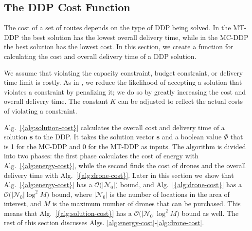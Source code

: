 \documentclass[journal]{IEEEtran}
\begin{document}
\subsection{The DDP Cost Function}
\label{ssec:route-costs}

The cost of a set of routes depends on the type of DDP being solved. In the MT-DDP the best solution has the lowest overall delivery time, while in the MC-DDP the best solution has the lowest cost. In this section, we create a function for calculating the cost and overall delivery time of a DDP solution.

We assume that violating the capacity constraint, budget constraint, or delivery time limit is costly. As in \cite{Xiao2012}, we reduce the likelihood of accepting a solution that violates a constraint by penalizing it; we do so by greatly increasing the cost and overall delivery time. The constant ${\ensuremath{K}}$ can be adjusted to reflect the actual costs of violating a constraint.

{Alg.~\ref{{alg:solution-cost}}} calculates the overall cost and delivery time of a solution ${\ensuremath{\mathbf{s}}}$ to the DDP. It takes the solution vector ${\ensuremath{\mathbf{s}}}$ and a boolean value ${\ensuremath{\Phi}}$ that is 1 for the MC-DDP and 0 for the MT-DDP as inputs. The algorithm is divided into two phases: the first phase calculates the cost of energy with {Alg.~\ref{{alg:energy-cost}}}, while the second finds the cost of drones and the overall delivery time with {Alg.~\ref{{alg:drone-cost}}}. Later in this section we show that {Alg.~\ref{{alg:energy-cost}}} has a ${\ensuremath{\mathcal{O}\bigl({|{\ensuremath{{\ensuremath{\mathcal{N}}}_{0}}}|}\bigr)}}$ bound, and {Alg.~\ref{{alg:drone-cost}}} has a ${\ensuremath{\mathcal{O}\bigl({|{\ensuremath{{\ensuremath{\mathcal{N}}}_{0}}}|\log^2{\ensuremath{M}}}\bigr)}}$ bound, where $|{\ensuremath{{\ensuremath{\mathcal{N}}}_{0}}}|$ is the number of locations in the area of interest, and ${\ensuremath{M}}$ is the maximum number of drones that can be purchased. This means that {Alg.~\ref{{alg:solution-cost}}} has a ${\ensuremath{\mathcal{O}\bigl({|{\ensuremath{{\ensuremath{\mathcal{N}}}_{0}}}|\log^2{\ensuremath{M}}}\bigr)}}$ bound as well. The rest of this section discusses Algs. \ref{alg:energy-cost}-\ref{alg:drone-cost}.
\end{document}
